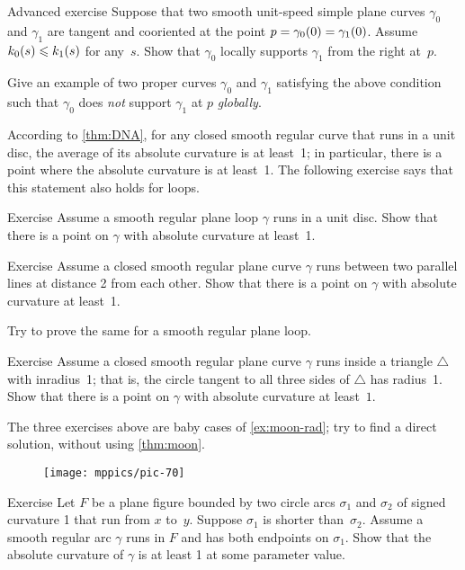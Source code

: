 \begin{thm}{Advanced exercise}\label{ex:support}
Suppose that two smooth unit-speed simple plane curves $\gamma_0$ and $\gamma_1$ are tangent and cooriented at the point $p\z=\gamma_0(0)\z=\gamma_1(0)$.
Assume $k_0(s)\leqslant k_1(s)$ for any~$s$.
Show that $\gamma_0$ locally supports $\gamma_1$ from the right at~$p$.

Give an example of two proper curves $\gamma_0$ and $\gamma_1$ satisfying the above condition such that $\gamma_0$ does {}\emph{not} support $\gamma_1$ at $p$ {}\emph{globally}.
\end{thm}

According to \ref{thm:DNA}, for any closed smooth regular curve that runs in a unit disc, the average of its absolute curvature is at least~1; in particular, there is a point where the absolute curvature is at least~1.
The following exercise says that this statement also holds for loops.

\begin{thm}{Exercise}\label{ex:in-circle}
Assume a smooth regular plane loop $\gamma$ runs in a unit disc.
Show that there is a point on $\gamma$ with absolute curvature at least~1.
\end{thm}


\begin{thm}{Exercise}\label{ex:between-parallels-1}
Assume a closed smooth regular plane curve $\gamma$ runs between two parallel lines at distance 2 from each other.
Show that there is a point on $\gamma$ with absolute curvature at least~1.

Try to prove the same for a smooth regular plane loop.
\end{thm}

\begin{thm}{Exercise}\label{ex:in-triangle}
Assume a closed smooth regular plane curve $\gamma$ runs inside a triangle $\triangle$ with inradius~1; that is, the circle tangent to all three sides of $\triangle$ has radius~1. 
Show that there is a point on $\gamma$ with absolute curvature at least~$1$.
\end{thm}

The three exercises above are baby cases of \ref{ex:moon-rad}; try to find a direct solution, without using \ref{thm:moon}.

{

\begin{wrapfigure}{o}{32 mm}
\vskip-4mm
\centering
\texttt{[image: mppics/pic-70]}
\vskip0mm
\end{wrapfigure}

\begin{thm}{Exercise}\label{ex:lens}
Let $F$ be a plane figure bounded by two circle arcs $\sigma_1$ and $\sigma_2$ of signed curvature 1 that run from $x$ to~$y$.
Suppose $\sigma_1$ is shorter than~$\sigma_2$.
Assume a smooth regular arc $\gamma$ runs in $F$ and has both endpoints on $\sigma_1$.
Show that the absolute curvature of $\gamma$ is at least 1 at some parameter value.

\end{thm}

}


